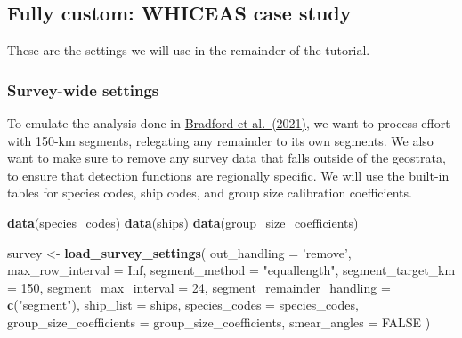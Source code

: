 \documentclass[
]{book}
\newenvironment{Shaded}{\begin{snugshade}}{\end{snugshade}}
\newcommand{\DataTypeTok}[1]{\textcolor[rgb]{0.13,0.29,0.53}{#1}}
\newcommand{\DecValTok}[1]{\textcolor[rgb]{0.00,0.00,0.81}{#1}}
\newcommand{\KeywordTok}[1]{\textcolor[rgb]{0.13,0.29,0.53}{\textbf{#1}}}
\newcommand{\NormalTok}[1]{#1}
\newcommand{\OtherTok}[1]{\textcolor[rgb]{0.56,0.35,0.01}{#1}}
\newcommand{\StringTok}[1]{\textcolor[rgb]{0.31,0.60,0.02}{#1}}
\begin{document}
\hypertarget{fully-custom-whiceas-case-study}{%
\subsection*{Fully custom: WHICEAS case study}\label{fully-custom-whiceas-case-study}}

These are the settings we will use in the remainder of the tutorial.

\hypertarget{survey-wide-settings-1}{%
\subsubsection*{Survey-wide settings}\label{survey-wide-settings-1}}

To emulate the analysis done in \href{https://repository.library.noaa.gov/view/noaa/47788}{Bradford et al.~(2021)}, we want to process effort with 150-km segments, relegating any remainder to its own segments. We also want to make sure to remove any survey data that falls outside of the geostrata, to ensure that detection functions are regionally specific. We will use the built-in tables for species codes, ship codes, and group size calibration coefficients.

\begin{Shaded}
\begin{Highlighting}[]
\KeywordTok{data}\NormalTok{(species_codes)}
\KeywordTok{data}\NormalTok{(ships)}
\KeywordTok{data}\NormalTok{(group_size_coefficients)}

\NormalTok{survey <-}\StringTok{ }\KeywordTok{load_survey_settings}\NormalTok{(}
  \DataTypeTok{out_handling =} \StringTok{'remove'}\NormalTok{,}
  \DataTypeTok{max_row_interval =} \OtherTok{Inf}\NormalTok{,}
  \DataTypeTok{segment_method =} \StringTok{"equallength"}\NormalTok{,}
  \DataTypeTok{segment_target_km =} \DecValTok{150}\NormalTok{,}
  \DataTypeTok{segment_max_interval =} \DecValTok{24}\NormalTok{,}
  \DataTypeTok{segment_remainder_handling =} \KeywordTok{c}\NormalTok{(}\StringTok{"segment"}\NormalTok{),}
  \DataTypeTok{ship_list =}\NormalTok{ ships,}
  \DataTypeTok{species_codes =}\NormalTok{ species_codes,}
  \DataTypeTok{group_size_coefficients =}\NormalTok{ group_size_coefficients,}
  \DataTypeTok{smear_angles =} \OtherTok{FALSE}
\NormalTok{)}
\end{Highlighting}
\end{Shaded}
\end{document}
